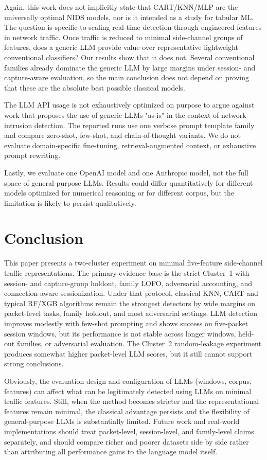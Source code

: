 \documentclass[conference]{IEEEtran}
\begin{document}
Again, this work does not implicitly state that CART/KNN/MLP are the universally optimal NIDS models, nor is it intended as a study for tabular ML. The question is specific to scaling real-time detection through engineered features in network traffic. Once traffic is reduced to  minimal side-channel groups of features, does a generic LLM provide value over representative lightweight conventional classifiers? Our results show that it does not. Several conventional families already dominate the generic LLM by large margins under session- and capture-aware evaluation, so the main conclusion does not depend on proving that these are the absolute best possible classical models.

The LLM API usage is not exhaustively optimized on purpose to argue against work that proposes the use of generic LLMs "as-is" in the context of network intrusion detection. The reported runs use one verbose prompt template family and compare zero-shot, few-shot, and chain-of-thought variants. We do not evaluate domain-specific fine-tuning, retrieval-augmented context, or exhaustive prompt rewriting. 

Lastly, we evaluate one OpenAI model and one Anthropic model, not the full space of general-purpose LLMs. Results could differ quantitatively for different models optimized for numerical reasoning or for different corpus, but the limitation is likely to persist qualitatively.


\section{Conclusion}
\label{sec:conclusion}

This paper presents a two-cluster experiment on minimal five-feature side-channel traffic representations. The primary evidence base is the strict Cluster~1 with session- and capture-group holdout, family LOFO, adversarial accounting, and connection-aware sessionization. Under that protocol, classical KNN, CART and typical RF/XGB algorithms remain the strongest detectors by wide margins on packet-level tasks, family holdout, and most adversarial settings. LLM detection improves modestly with few-shot prompting and shows success on five-packet session windows, but its performance is not stable across longer windows, held-out families, or adversarial evaluation. The Cluster~2 random-leakage experiment produces somewhat higher packet-level LLM scores, but it still cannot support strong conclusions.

Obviously, the evaluation design and configuration of LLMs (windows, corpus, features) can affect what can be legitimately detected using LLMs on minimal traffic features. Still, when the method becomes stricter and the representational features remain minimal, the classical advantage persists and the flexibility of general-purpose LLMs is substantially limited. Future work and real-world implementations should treat packet-level, session-level, and family-level claims separately, and should compare richer and poorer datasets side by side rather than attributing all performance gains to the language model itself.
\end{document}
